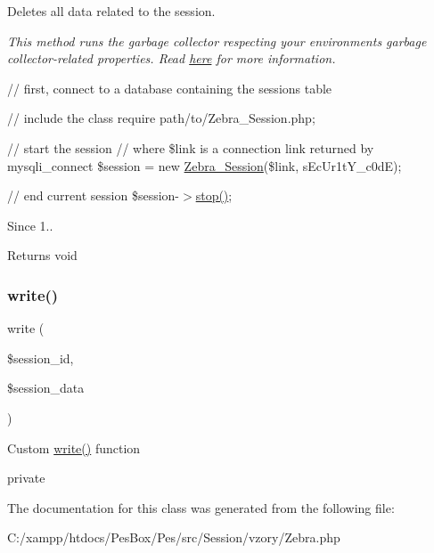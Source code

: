 Deletes all data related to the session.

{\itshape This method runs the garbage collector respecting your environment\textquotesingle{}s garbage collector-\/related properties. Read \mbox{\hyperlink{class_zebra___session_ad455e02743bbe3986d80650f417bd206}{here}} for more information.}

{\ttfamily  // first, connect to a database containing the sessions table}

{\ttfamily // include the class require \textquotesingle{}path/to/\+Zebra\+\_\+\+Session.\+php\textquotesingle{};}

{\ttfamily // start the session // where \$link is a connection link returned by mysqli\+\_\+connect \$session = new \mbox{\hyperlink{class_zebra___session}{Zebra\+\_\+\+Session}}(\$link, \textquotesingle{}s\+Ec\+Ur1t\+Y\+\_\+c0dE\textquotesingle{});}

{\ttfamily // end current session \$session-\/$>$\mbox{\hyperlink{class_zebra___session_a8b6fc76a620d7557d06e9a11a9ffb509}{stop()}}; }

\begin{DoxySince}{Since}
1..
\end{DoxySince}
\begin{DoxyReturn}{Returns}
void 
\end{DoxyReturn}
\mbox{\label{class_zebra___session_ad9d124885be93668f1dbf6aace5964f5}} 
\subsubsection{\texorpdfstring{write()}{write()}}
{\footnotesize\ttfamily write (\begin{DoxyParamCaption}\item[{}]{\$session\+\_\+id,  }\item[{}]{\$session\+\_\+data }\end{DoxyParamCaption})}

Custom \mbox{\hyperlink{class_zebra___session_ad9d124885be93668f1dbf6aace5964f5}{write()}} function

private 

The documentation for this class was generated from the following file\+:\begin{DoxyCompactItemize}
\item 
C\+:/xampp/htdocs/\+Pes\+Box/\+Pes/src/\+Session/vzory/Zebra.\+php\end{DoxyCompactItemize}
